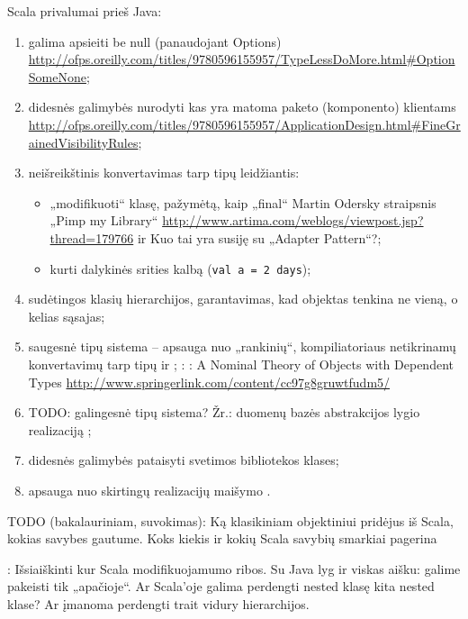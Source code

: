 Scala privalumai prieš Java:
\begin{enumerate}
  \item galima apsieiti be null (panaudojant Options)
    \url{http://ofps.oreilly.com/titles/9780596155957/TypeLessDoMore.html#OptionSomeNone};
  \item didesnės galimybės nurodyti kas yra matoma paketo (komponento)
    klientams
    \url{http://ofps.oreilly.com/titles/9780596155957/ApplicationDesign.html#FineGrainedVisibilityRules};
  \item neišreikštinis konvertavimas tarp tipų leidžiantis:
    \begin{itemize}
      \item „modifikuoti“ klasę, pažymėtą, kaip „final“
        Martin Odersky straipsnis „Pimp my Library“
        \url{http://www.artima.com/weblogs/viewpost.jsp?thread=179766}
        ir \cite[173]{beginning-scala}
        \TODO Kuo tai yra susiję su „Adapter Pattern“?;
      \item kurti dalykinės srities kalbą\cite[175]{beginning-scala}
        (\verb|val a = 2 days|);
    \end{itemize}
  \item sudėtingos klasių hierarchijos, garantavimas, kad objektas
    tenkina ne vieną, o kelias sąsajas\cite[184]{beginning-scala};
  \item saugesnė tipų sistema – apsauga nuo „rankinių“,
    kompiliatoriaus netikrinamų konvertavimų tarp tipų
    \cite[172]{beginning-scala} ir
     \cite[207]{beginning-scala};
    \TODO: \cite{scala:type-checking}
    \TODO: A Nominal Theory of Objects with Dependent Types
    \url{http://www.springerlink.com/content/cc97g8gruwtfudm5/}
  \item TODO: galingesnė tipų sistema? Žr.: duomenų bazės abstrakcijos
    lygio realizaciją \cite[190]{beginning-scala};
  \item didesnės galimybės pataisyti svetimos bibliotekos klases;
  \item apsauga nuo skirtingų realizacijų maišymo
    \cite[24p.]{scala-design-patterns}.
\end{enumerate}

TODO (bakalauriniam, suvokimas): Ką klasikiniam objektiniui pridėjus
iš Scala, kokias savybes gautume. Koks kiekis ir kokių Scala savybių
smarkiai pagerina 

\TODO: Išsiaiškinti kur Scala modifikuojamumo ribos. Su Java lyg ir
viskas aišku: galime pakeisti tik „apačioje“. Ar Scala'oje galima
perdengti nested klasę kita nested klase? Ar įmanoma perdengti trait
vidury hierarchijos. 

